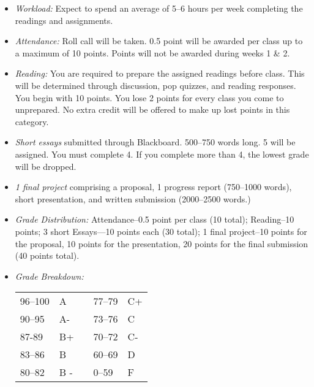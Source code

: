 \documentclass[article,oneside]{memoir}
\begin{document}
\begin{itemize}
\item \textit{Workload:} Expect to spend an average of 5--6 hours per week  completing the readings and assignments.

\item \textit{Attendance:} Roll call will be taken. 0.5 point will be awarded per class up to a maximum of 10 points. Points will not be awarded during weeks 1 \& 2. 

\item \textit{Reading:} You are required to prepare the assigned readings before class. This will be determined through discussion, pop quizzes, and reading responses. You begin with 10 points. You lose 2 points for every class you come to unprepared. No extra credit will be offered to make up lost points in this category. 

\item \textit{Short essays} submitted through Blackboard. 500--750 words long. 5 will be assigned. You must complete 4. If you complete more than 4, the lowest grade will be dropped.
 
\item \textit{1 final project} comprising a proposal, 1 progress report (750--1000 words), short presentation, and written submission (2000--2500 words.)



\item \textit{Grade Distribution:} Attendance--0.5 point per class (10 total); Reading--10 points; 3 short Essays---10 points each (30 total); 1 final project--10 points for the proposal, 10 points for the presentation, 20 points for the final submission (40 points total).

\item \textit{Grade Breakdown:}

 \begin{tabular}{ | l | l | p{2cm} | l | l | }
    \hline 
96--100 & A  & &  77--79 &  C+ \\  
90--95 & A- & &  73--76 & C \\
87-89 & B+ &  &  70--72 & C- \\ 
83--86 & B  & &  60--69 & D\\
80--82 & B - & & 0--59 & F\\ \hline
    \end{tabular}


\end{itemize}
\end{document}

